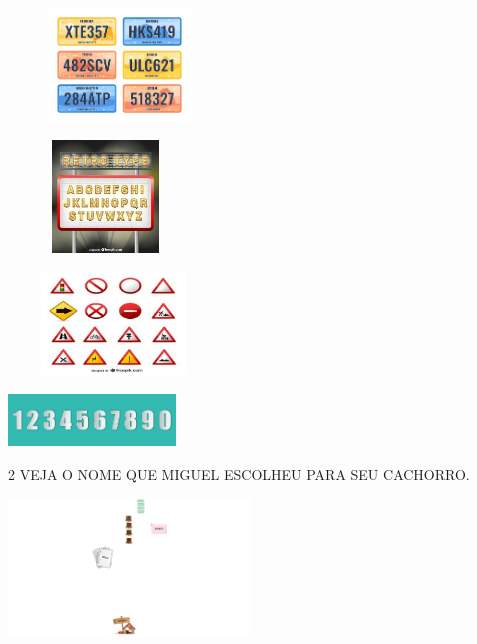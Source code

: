 \begin{escolha}
\item \includegraphics[width=2.32569in,height=1.18472in]{media/image222.jpg}

\item \includegraphics[width=2.03125in,height=1.17361in]{media/image223.jpg}

\item \includegraphics[width=2.20764in,height=1.07569in]{media/image224.jpg}

\item \includegraphics[width=1.75000in,height=0.54792in]{media/image225.jpg}
\end{escolha}


\num{2} VEJA O NOME QUE MIGUEL ESCOLHEU PARA SEU CACHORRO. 

\includegraphics[width=2.53194in,height=1.44514in]{media/image226.png}

